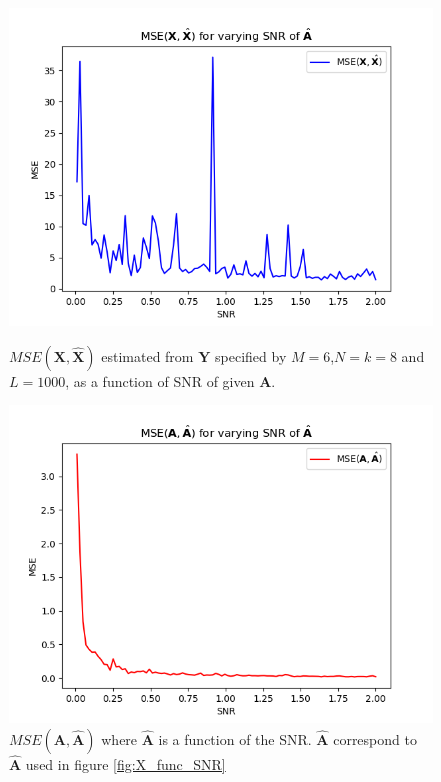 \begin{figure}[H]
    \begin{minipage}[t]{.45\textwidth}
    	\centering
		\includegraphics[scale=0.5]{figures/ch_6/X_func_SNR.png}
		\caption{$MSE(\textbf{X},\hat{\textbf{X}})$ estimated from $\textbf{Y}$ specified by $M=6$,$N=k=8$ and $L=1000$, as a function of SNR of given $\textbf{A}$. }
		\label{fig:X_func_SNR}
    \end{minipage} 
    \hfill
    \begin{minipage}[t]{.45\textwidth}
        \centering
		\includegraphics[scale=0.5]{figures/ch_6/A_func_SNR.png}
		\caption{$MSE(\textbf{A},\hat{\textbf{A}})$ where $\hat{\textbf{A}}$ is a function of the SNR. $\hat{\textbf{A}}$ correspond to $\hat{\textbf{A}}$ used in figure \ref{fig:X_func_SNR}}
		\label{fig:A_func_SNR}
    \end{minipage}
\end{figure}